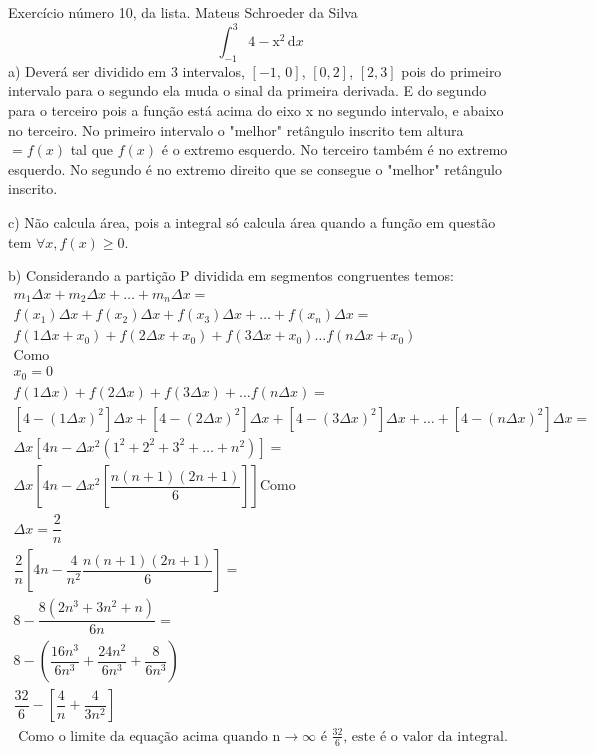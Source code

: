 \documentclass{article}
\begin{document}
    Exercício número 10, da lista.
    Mateus Schroeder da Silva
    \begin{equation}
        \int_{-1}^{3}\mathrm{4-x^2}\,\text{d}x
    \end{equation}
    a) Deverá ser dividido em 3 intervalos, $[-1,\, 0]$, $[0,2]$, $[2,3]$
    pois do primeiro intervalo para o segundo ela muda o sinal da primeira derivada.
    E do segundo para o terceiro pois a função está acima do eixo x no segundo intervalo,
    e abaixo no terceiro. No primeiro intervalo o "melhor" retângulo inscrito tem altura 
    $ = f(x)$ tal que $f(x)$ é o extremo esquerdo. No terceiro também é no extremo esquerdo.
    No segundo é no extremo direito que se consegue o "melhor" retângulo inscrito.

    c) Não calcula área, pois a integral só calcula área quando a função em questão tem
    $\forall x, f(x) \ge 0 $.

    b) Considerando a partição P dividida em segmentos congruentes temos:
    \begin{gather*}
        m_1\Delta x + m_2 \Delta x + \hdots + m_n \Delta x = \\
        f(x_1)\Delta x + f(x_2)\Delta x + f(x_3)\Delta x + \hdots + f(x_n)\Delta x = \\
        f(1\Delta x + x_0) + f(2\Delta x + x_0) + f(3\Delta x + x_0) \hdots f(n\Delta x + x_0)\\
        \text{Como} \\
        x_0 = 0 \\
        f(1 \Delta x) + f(2 \Delta x) + f(3 \Delta x) + \hdots f(n \Delta x) = \\
        \left[ 4 - ( 1 \Delta x )^2\right] \Delta x + \left[4 - (2 \Delta x)^2\right] \Delta x + \left[4 - (3 \Delta x)^2\right] \Delta x + \hdots + \left[4 - (n \Delta x)^2\right] \Delta x = \\
        \Delta x [ 4n - \Delta x^2 (1^2 + 2^2 + 3^2 + \hdots + n^2) ] = \\
        \Delta x \left[ 4n - \Delta x^2 \left[\dfrac{n(n+1)(2n+1)}{6}\right] \right]
        \text{Como} \\
        \Delta x = \dfrac{2}{n} \\
        \dfrac{2}{n} \left[ 4n - \dfrac{4}{n^2}  \dfrac{n(n+1)(2n+1)}{6} \right] = \\
        8 - \dfrac{8 \left( 2n^3 + 3n^2 + n\right) }{6n} = \\
        8 - ( \dfrac{16n^3}{6n^3} +  \dfrac{24n^2}{6n^3} +  \dfrac{8}{6n^3} ) \\
        \dfrac{32}{6} - \left[ \dfrac{4}{n} + \dfrac{4}{3n^2} \right] \\
        \text{ Como o limite da equação acima quando n} \rightarrow \infty \text{ é } \frac{32}{6} \text{, este é o valor da integral.} \\ 
     \end{gather*}
\end{document}
